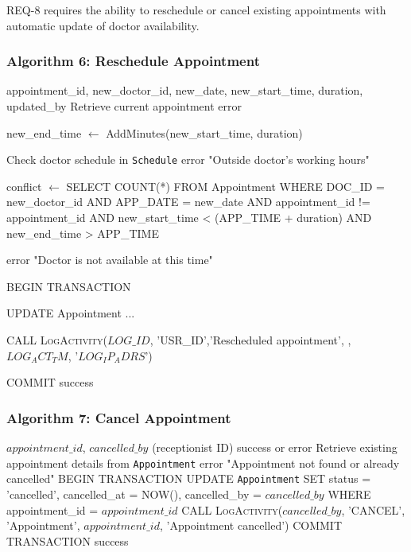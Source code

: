 REQ-8 requires the ability to reschedule or cancel existing appointments with automatic update of doctor availability.

\subsubsection{Algorithm 6: Reschedule Appointment}

\begin{algorithm}[H]
	\caption{Reschedule Appointment with Real-Time Availability Check}
	\begin{algorithmic}[1]
		\REQUIRE appointment\_id, new\_doctor\_id, new\_date, new\_start\_time, duration, updated\_by
		\STATE Retrieve current appointment
		\RETURN error
		\ENDIF
		
		\STATE new\_end\_time $\leftarrow$ AddMinutes(new\_start\_time, duration)
		
		\STATE Check doctor schedule in \texttt{Schedule}
		\RETURN error "Outside doctor's working hours"
		\ENDIF
		
		\STATE conflict $\leftarrow$
		SELECT COUNT(*) FROM Appointment
		WHERE DOC\_ID = new\_doctor\_id
		AND APP\_DATE = new\_date
		AND appointment\_id != appointment\_id
		AND new\_start\_time < (APP\_TIME + duration)
		AND new\_end\_time > APP\_TIME
		
		\RETURN error "Doctor is not available at this time"
		\ENDIF
		
		\STATE BEGIN TRANSACTION
		
		\STATE UPDATE Appointment ...
		
		\STATE CALL \textsc{LogActivity}($LOG\_ID$, 'USR\_ID','Rescheduled appointment', , $LOG_ACT_TM$, '$LOG_IP_ADRS$')
		
		\STATE COMMIT
		\RETURN success
	\end{algorithmic}
\end{algorithm}

\subsubsection{Algorithm 7: Cancel Appointment}

\begin{algorithm}[H]
	\caption{Cancel Appointment}
	\label{alg:cancel-appointment}
	\begin{algorithmic}[1]
		\REQUIRE $appointment\_id$, $cancelled\_by$ (receptionist ID)
		\ENSURE success or error
		\STATE Retrieve existing appointment details from \texttt{Appointment}
		\RETURN error "Appointment not found or already cancelled"
		\ENDIF
		\STATE BEGIN TRANSACTION
		\STATE UPDATE \texttt{Appointment} SET
		status = 'cancelled',
		cancelled\_at = NOW(),
		cancelled\_by = $cancelled\_by$
		WHERE appointment\_id = $appointment\_id$
		\STATE CALL \textsc{LogActivity}($cancelled\_by$, 'CANCEL', 'Appointment', $appointment\_id$, 'Appointment cancelled')
		\STATE COMMIT TRANSACTION
		\RETURN success
	\end{algorithmic}
\end{algorithm}

